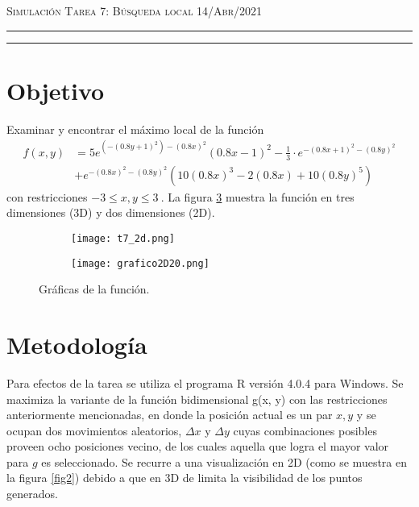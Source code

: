 \documentclass[12pt]{amsart}
\begin{document}
\pagestyle{empty}



\thispagestyle{empty}

{\scshape Simulación} \hfill {\scshape \Large Tarea 7: Búsqueda local} \hfill  {\scshape 14/Abr/2021}
\author{C. María Montemayor Palos}
\maketitle

\hrule
\hrule
\bigskip
\section{Objetivo}
Examinar y encontrar el máximo local de la función 
\begin{align*}
f(x,y) &= 5e^{(-(0.8y + 1)^2)-(0.8x)^2}(0.8x-1)^2 - \frac{1}{3}\cdot e^{-(0.8x+1)^2-(0.8y)^2}\\ &+e^{-(0.8x)^2-(0.8y)^2}(10(0.8x)^3-2(0.8x)+10(0.8y)^5)
\end{align*}
con restricciones $ -3 \leq x, y \leq 3 \ $. La figura \ref{fig1} muestra la función en tres dimensiones (3D) y dos dimensiones (2D).

\begin{figure}[h!]
\centering
\begin{subfigure}[H]{0.4\linewidth}
\texttt{[image: t7\_2d.png]}
\caption{}
\label{1a}
\end{subfigure}
\begin{subfigure}[H]{0.4\linewidth}
\texttt{[image: grafico2D20.png]}
\caption{}
\label{1b}
\end{subfigure}
\caption{Gráficas de la función.}
\label{fig1}
\end{figure}

\section{Metodología}
Para efectos de la tarea \cite{dra} se utiliza el programa R versión 4.0.4 \cite{R} para Windows. Se maximiza la variante de la función bidimensional g(x, y) con las restricciones anteriormente mencionadas, en donde la posición actual es un par $x, y$ y se ocupan dos movimientos aleatorios, $\Delta x$ y $\Delta y$ cuyas combinaciones posibles proveen ocho posiciones vecino, de los cuales aquella que logra el mayor valor para $g$ es seleccionado. Se recurre a una visualización en 2D (como se muestra en la figura \ref{fig2}) debido a que en 3D de limita la visibilidad de los puntos generados.
\end{document}
